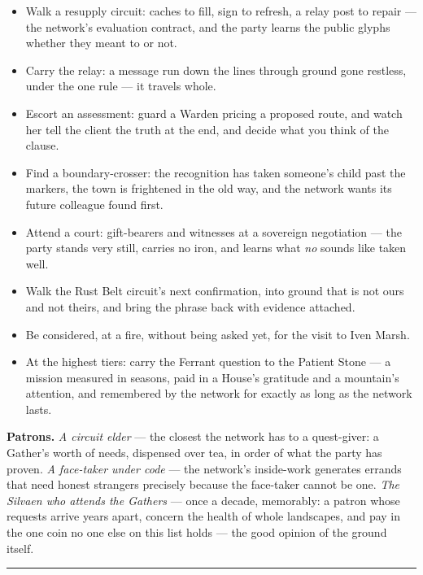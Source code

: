 \begin{itemize}
    \item Walk a resupply circuit: caches to fill, sign to refresh, a relay post to repair --- the network's evaluation contract, and the party learns the public glyphs whether they meant to or not.
    \item Carry the relay: a message run down the lines through ground gone restless, under the one rule --- it travels whole.
    \item Escort an assessment: guard a Warden pricing a proposed route, and watch her tell the client the truth at the end, and decide what you think of the clause.
    \item Find a boundary-crosser: the recognition has taken someone's child past the markers, the town is frightened in the old way, and the network wants its future colleague found first.
    \item Attend a court: gift-bearers and witnesses at a sovereign negotiation --- the party stands very still, carries no iron, and learns what \textit{no} sounds like taken well.
    \item Walk the Rust Belt circuit's next confirmation, into ground that is not ours and not theirs, and bring the phrase back with evidence attached.
    \item Be considered, at a fire, without being asked yet, for the visit to Iven Marsh.
    \item At the highest tiers: carry the Ferrant question to the Patient Stone --- a mission measured in seasons, paid in a House's gratitude and a mountain's attention, and remembered by the network for exactly as long as the network lasts.
\end{itemize}

\textbf{Patrons.} \textit{A circuit elder} --- the closest the network has to a quest-giver: a Gather's worth of needs, dispensed over tea, in order of what the party has proven. \textit{A face-taker under code} --- the network's inside-work generates errands that need honest strangers precisely because the face-taker cannot be one. \textit{The Silvaen who attends the Gathers} --- once a decade, memorably: a patron whose requests arrive years apart, concern the health of whole landscapes, and pay in the one coin no one else on this list holds --- the good opinion of the ground itself.

\medskip\hrule\medskip
